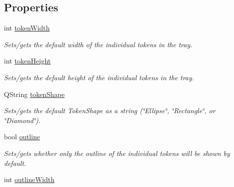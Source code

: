\subsection*{Properties}
\begin{DoxyCompactItemize}
\item 
\hypertarget{class_picto_1_1_token_tray_graphic_acff27bf3f2cd0534f1f3baf00e7257b3}{int \hyperlink{class_picto_1_1_token_tray_graphic_acff27bf3f2cd0534f1f3baf00e7257b3}{token\-Width}}\label{class_picto_1_1_token_tray_graphic_acff27bf3f2cd0534f1f3baf00e7257b3}

\begin{DoxyCompactList}\small\item\em Sets/gets the default width of the individual tokens in the tray. \end{DoxyCompactList}\item 
\hypertarget{class_picto_1_1_token_tray_graphic_a161537efc77b18df7ab513af2ce3d2a0}{int \hyperlink{class_picto_1_1_token_tray_graphic_a161537efc77b18df7ab513af2ce3d2a0}{token\-Height}}\label{class_picto_1_1_token_tray_graphic_a161537efc77b18df7ab513af2ce3d2a0}

\begin{DoxyCompactList}\small\item\em Sets/gets the default height of the individual tokens in the tray. \end{DoxyCompactList}\item 
\hypertarget{class_picto_1_1_token_tray_graphic_a593b971f80d8858d6869cc04c25a7bfb}{Q\-String \hyperlink{class_picto_1_1_token_tray_graphic_a593b971f80d8858d6869cc04c25a7bfb}{token\-Shape}}\label{class_picto_1_1_token_tray_graphic_a593b971f80d8858d6869cc04c25a7bfb}

\begin{DoxyCompactList}\small\item\em Sets/gets the default Token\-Shape as a string (\char`\"{}\-Ellipse\char`\"{}, \char`\"{}\-Rectangle\char`\"{}, or \char`\"{}\-Diamond\char`\"{}). \end{DoxyCompactList}\item 
\hypertarget{class_picto_1_1_token_tray_graphic_ab7e9dc1ac6bbabfeb2dbdf2d10aee1c8}{bool \hyperlink{class_picto_1_1_token_tray_graphic_ab7e9dc1ac6bbabfeb2dbdf2d10aee1c8}{outline}}\label{class_picto_1_1_token_tray_graphic_ab7e9dc1ac6bbabfeb2dbdf2d10aee1c8}

\begin{DoxyCompactList}\small\item\em Sets/gets whether only the outline of the individual tokens will be shown by default. \end{DoxyCompactList}\item 
\hypertarget{class_picto_1_1_token_tray_graphic_a2b9b6aaf7e037680fd8f2af55df5e280}{int \hyperlink{class_picto_1_1_token_tray_graphic_a2b9b6aaf7e037680fd8f2af55df5e280}{outline\-Width}}\label{class_picto_1_1_token_tray_graphic_a2b9b6aaf7e037680fd8f2af55df5e280}


\end{DoxyCompactItemize}
